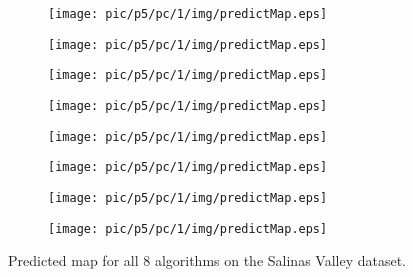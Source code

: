 \documentclass{article}
\begin{document}
	\begin{figure}
		\begin{subfigure}{0.12\textwidth}
			\texttt{[image: pic/p5/pc/1/img/predictMap.eps]}
			\caption{}
		\end{subfigure}
		\begin{subfigure}{0.12\textwidth}
			\texttt{[image: pic/p5/pc/1/img/predictMap.eps]}
			\caption{}
		\end{subfigure}
		\begin{subfigure}{0.12\textwidth}
			\texttt{[image: pic/p5/pc/1/img/predictMap.eps]}
			\caption{}
		\end{subfigure}
		\begin{subfigure}{0.12\textwidth}
			\texttt{[image: pic/p5/pc/1/img/predictMap.eps]}
			\caption{}
		\end{subfigure}
		\begin{subfigure}{0.12\textwidth}
			\texttt{[image: pic/p5/pc/1/img/predictMap.eps]}
			\caption{}
		\end{subfigure}
		\begin{subfigure}{0.12\textwidth}
			\texttt{[image: pic/p5/pc/1/img/predictMap.eps]}
			\caption{}
		\end{subfigure}
		\begin{subfigure}{0.12\textwidth}
			\texttt{[image: pic/p5/pc/1/img/predictMap.eps]}
			\caption{}
		\end{subfigure}
		\begin{subfigure}{0.12\textwidth}
			\texttt{[image: pic/p5/pc/1/img/predictMap.eps]}
			\caption{}
		\end{subfigure}
		\caption{Predicted map for all 8 algorithms on the Salinas Valley dataset.}
		\label{svpm}
	\end{figure}
\end{document}
